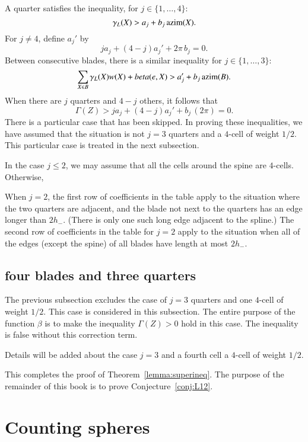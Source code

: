 A quarter satisfies the inequality, for $j\in\{1,\ldots,4\}$:
$$
\gamma_L(X) > a_j + b_j\, {\operatorname{azim}}(X).
$$
For $j\ne4$, define $a_j'$ by
$$
  j a _j + (4-j) a_j' + 2\pi\,b_j = 0.
$$
Between consecutive blades, there is a similar inequality for $j\in\{1,\ldots,3\}$:
$$
\sum_{X\in B} \gamma_L(X)w(X) +beta(e,X) > a_j' + b_j\,{\operatorname{azim}}(B).
$$
When there are $j$ quarters and $4-j$ others, it follows that
\begin{equation}\label{eqn:4bl}
  \Gamma(Z) > j a_j + (4-j) a_j' + b_j\, (2\pi) = 0.
\end{equation}
There is a particular case that has been skipped.  In proving these inequalities, we have assumed that the situation is not  $j=3$ quarters and a $4$-cell of weight $1/2$. This particular case is treated in the next subsection. 

In the case $j\le 2$, we may assume that all the cells around the spine are $4$-cells.  Otherwise,

When $j=2$, the first row of coefficients in the table apply to the situation where the two quarters are adjacent, and the blade not next to the quarters has an edge longer than $2h_-$.  (There is only one such long edge adjacent to the spline.)  The second row of coefficients in the table for $j=2$ apply to the situation when all of the edges (except the spine) of all blades have length at most $2h_-$.

\subsection{four blades and three quarters}

The previous subsection excludes the case of $j=3$ quarters and one $4$-cell of weight $1/2$.  This case is considered in this subsection.  The entire purpose of the function $\beta$ is to make the inequality $\Gamma(Z)>0$ hold in this case.  The inequality is false without this correction term.

\begin{note} %
Details will be added about the case $j=3$ and a fourth cell a $4$-cell of weight $1/2$.
\end{note}


\smallskip

This completes the proof of Theorem~\ref{lemma:superineq}.  The purpose of the remainder of this book is to prove Conjecture~\ref{conj:L12}.



\section{Counting spheres}

